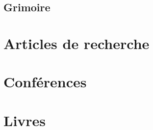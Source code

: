 \documentclass[11pt,a4paper]{article}
\begin{document}
\newpage
\begin{center}  
\section*{Grimoire} 
\end{center}








\section{Articles de recherche}

\section{Conférences}

\section{Livres}
\end{document}

